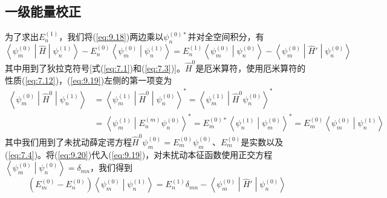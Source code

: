 \subsection*{一级能量校正}

    为了求出$E_n^{\left(1\right)}$，我们将(\ref{eq:9.18})两边乘以$\psi_n^{\left(0\right)\ast}$并对全空间积分，有
    \begin{equation}
        \left\langle \psi_m^{\left(0\right)} \middle| \hat{H} \middle| \psi_n^{\left(1\right)} \right\rangle - E_n^{\left(0\right)} \left\langle \psi_m^{\left(0\right)} \middle| \psi_n^{\left(1\right)} \right\rangle = E_n^{\left(1\right)} \left\langle \psi_m^{\left(0\right)} \middle| \psi_n^{\left(0\right)} \right\rangle - \left\langle \psi_m^{\left(0\right)} \middle| \hat{H}' \middle| \psi_n^{\left(0\right)} \right\rangle
        \label{eq:9.19}
    \end{equation}
    其中用到了狄拉克符号[式(\ref{eq:7.1})和(\ref{eq:7.3})]。$\hat{H}^0$是厄米算符，使用厄米算符的性质(\ref{eq:7.12})，(\ref{eq:9.19})左侧的第一项变为
    \begin{equation}
        \begin{aligned}
            \left\langle \psi_m^{\left(0\right)} \middle| \hat{H}^0 \middle| \psi_n^{\left(1\right)} \right\rangle &= \left\langle \psi_m^{\left(1\right)} \middle| \hat{H}^0 \middle| \psi_n^{\left(0\right)} \right\rangle^{\ast} = \left\langle \psi_m^{\left(1\right)} \middle| \hat{H}^0 \psi_n^{\left(0\right)} \right\rangle^{\ast} \\
            &= \left\langle \psi_m^{\left(1\right)} \middle| E_n^{\left(m\right)} \psi_n^{\left(0\right)} \right\rangle^{\ast} = E_m^{\left(0\right)\ast} \left\langle \psi_n^{\left(1\right)} \middle| \psi_m^{\left(0\right)} \right\rangle^{\ast} = E_m^{\left(0\right)} \left\langle \psi_m^{\left(0\right)} \middle| \psi_n^{\left(1\right)} \right\rangle
        \end{aligned}
        \label{eq:9.20}
    \end{equation}
    其中我们用到了未扰动薛定谔方程$\hat{H}^0 \psi_m^{\left(0\right)} = E_m^{\left(0\right)} \psi_m^{\left(0\right)}$、$E_m^{\left(0\right)}$是实数以及(\ref{eq:7.4})。将(\ref{eq:9.20})代入(\ref{eq:9.19})，对未扰动本征函数使用正交方程$\left\langle \psi_m^{\left(0\right)} \middle| \psi_n^{\left(0\right)} \right\rangle = \delta_{mn}$，我们得到
    \begin{equation}
        \left(E_m^{\left(0\right)} - E_n^{\left(0\right)}\right)\left\langle \psi_m^{\left(0\right)} \middle| \psi_n^{\left(1\right)} \right\rangle = E_n^{\left(1\right)}\delta_{mn} - \left\langle \psi_m^{\left(0\right)} \middle| \hat{H}' \middle| \psi_n^{\left(0\right)} \right\rangle
        \label{eq:9.21}
    \end{equation}
